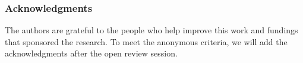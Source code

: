 \documentclass{article}
\newcommand{\<}{\langle}
\renewcommand{\>}{\rangle}
\theoremstyle{definition}\newtheorem{definition}{\textit{Definition}}
\begin{document}
\subsubsection*{Acknowledgments}
The authors are grateful to the people who help improve this work and fundings that sponsored the research. To meet the anonymous criteria, we will add the acknowledgments after the open review session.




\appendix
\end{document}
